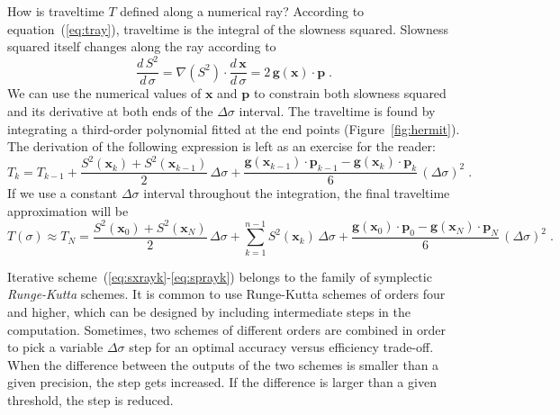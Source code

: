 How is traveltime $T$ defined along a numerical ray? According to
equation~(\ref{eq:tray}), traveltime is the integral of the slowness
squared. Slowness squared itself changes along the ray according to
\begin{equation}
  \label{eq:dsds}
  \frac{d\,S^2}{d\,\sigma} = 
  \nabla (S^2) \cdot \frac{d\,\mathbf{x}}{d\,\sigma} =
  2\,\mathbf{g}(\mathbf{x}) \cdot \mathbf{p}\;.
\end{equation}
We can use the numerical values of $\mathbf{x}$ and $\mathbf{p}$ to
constrain both slowness squared and its derivative at both ends of the
$\Delta \sigma$ interval. The traveltime is found by integrating a
third-order polynomial fitted at the end points
(Figure~\ref{fig:hermit}). The derivation of the following expression
is left as an exercise for the reader:
\begin{equation}
  \label{eq:tk}
  T_k = T_{k-1} + \frac{S^2(\mathbf{x}_k) +
    S^2(\mathbf{x}_{k-1})}{2}\,
  \Delta \sigma
  + \frac{\mathbf{g}(\mathbf{x}_{k-1}) \cdot \mathbf{p}_{k-1} -
    \mathbf{g}(\mathbf{x}_k) \cdot \mathbf{p}_k}{6}\,(\Delta \sigma)^2\;.
\end{equation}
If we use a constant $\Delta \sigma$ interval throughout the
integration, the final traveltime approximation will be
\begin{equation}
  \label{eq:tsigma}
  T(\sigma) \approx 
  T_N = \frac{S^2(\mathbf{x}_0)+S^2(\mathbf{x}_N)}{2}\,\Delta \sigma
  + \sum_{k=1}^{n-1} S^2(\mathbf{x}_k)\,\Delta \sigma
  + \frac{\mathbf{g}(\mathbf{x}_{0}) \cdot \mathbf{p}_{0} -
    \mathbf{g}(\mathbf{x}_N) \cdot \mathbf{p}_N}{6}\,(\Delta \sigma)^2\;.
\end{equation}


Iterative scheme~(\ref{eq:sxrayk}-\ref{eq:sprayk}) belongs to the
family of symplectic \emph{Runge-Kutta} schemes. It is common to use
Runge-Kutta schemes of orders four and higher, which can be designed
by including intermediate steps in the computation. Sometimes, two
schemes of different orders are combined in order to pick a variable
$\Delta \sigma$ step for an optimal accuracy versus efficiency
trade-off. When the difference between the outputs of the two schemes
is smaller than a given precision, the step gets increased. If the
difference is larger than a given threshold, the step is reduced.

